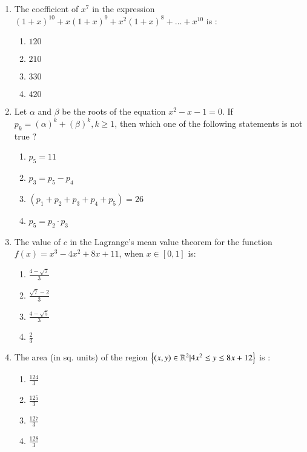 \documentclass[journal,12pt,twocolumn]{IEEEtran}
\theoremstyle{remark}
\begin{document}
\begin{enumerate}
    \item The coefficient of $x^7$ in the expression $(1 + x)^{10} + x(1 + x)^9 + x^2(1 + x)^8 +\dots+x^{10}$ is :
        \begin{enumerate}
            \item $120$
            \item $210$
            \item $330$
            \item $420$
        \end{enumerate}

    \item Let $\alpha$ and $\beta$ be the roots of the equation $x^2-x-1=0$. If $p_k=(\alpha)^k+(\beta)^k,k\geq1$, then which one of the following statements is not true ?
        \begin{enumerate}
            \item $p_5=11$
            \item $p_3=p_5-p_4$
            \item $(p_1+p_2+p_3+p_4+p_5)=26$
            \item $p_5=p_2\cdot p_3$
        \end{enumerate}

    \item The value of $c$ in the Lagrange's mean value theorem for the function $f(x)=x^3-4x^2+8x+11$, when $x\in[0,1]$ is:
        \begin{enumerate}
            \item $\frac{4-\sqrt{7}}{3}$
            \item $\frac{\sqrt{7}-2}{3}$
            \item $\frac{4-\sqrt{5}}{3}$
            \item $\frac{2}{3}$
        \end{enumerate}

    \item The area (in sq. units) of the region $\left\{(x,y)\in\mathbb{R}^2|4x^2\leq y\leq 8x+12\right\}$ is :
        \begin{enumerate}
            \item $\frac{124}{3}$
            \item $\frac{125}{3}$
            \item $\frac{127}{3}$
            \item $\frac{128}{3}$
        \end{enumerate}

\end{enumerate}
\end{document}
